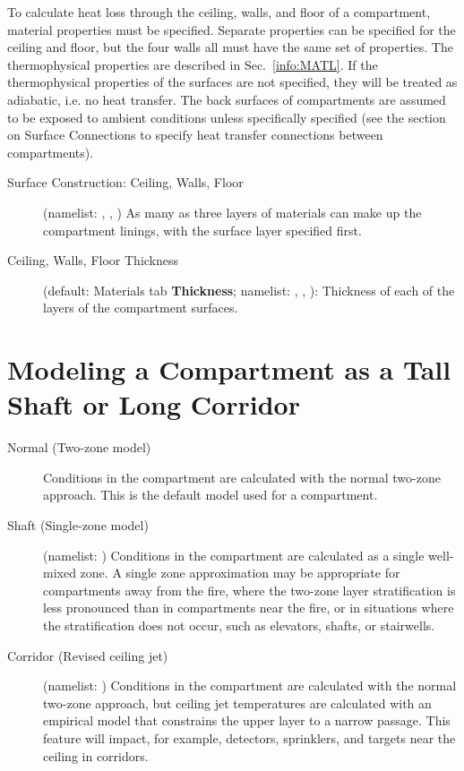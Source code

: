 To calculate heat loss through the ceiling, walls, and floor of a compartment, material properties must be specified. Separate properties can be specified for the ceiling and floor, but the four walls all must have the same set of properties. The thermophysical properties are described in Sec.~\ref{info:MATL}. If the thermophysical properties of the surfaces are not specified, they will be treated as adiabatic, i.e. no heat transfer. The back surfaces of compartments are assumed to be exposed to ambient conditions unless specifically specified (see the section on Surface Connections to specify heat transfer connections between compartments).

\begin{description}
\item[Surface Construction: Ceiling, Walls, Floor] (namelist: , , ) As many as three layers of materials can make up the compartment linings, with the surface layer specified first.

\item[Ceiling, Walls, Floor Thickness] (default: Materials tab \textbf{Thickness}; namelist: , , ): Thickness of each of the layers of the compartment surfaces.
\end{description}





\section{Modeling a Compartment as a Tall Shaft or Long Corridor}
\label{info:COMP3}

\begin{description}
\item[Normal (Two-zone model)] Conditions in the compartment are calculated with the normal two-zone approach. This is the default model used for a compartment.

\item[Shaft (Single-zone model)] (namelist: ) Conditions in the compartment are calculated as a single well-mixed zone. A single zone approximation may be appropriate for compartments away from the fire, where the two-zone layer stratification is less pronounced than in compartments near the fire, or in situations where the stratification does not occur, such as elevators, shafts, or stairwells.

\item[Corridor (Revised ceiling jet)] (namelist: ) Conditions in the compartment are calculated with the normal two-zone approach, but ceiling jet temperatures are calculated with an empirical model that constrains the upper layer to a narrow passage. This feature will impact, for example, detectors, sprinklers, and targets near the ceiling in corridors.
\end{description}





